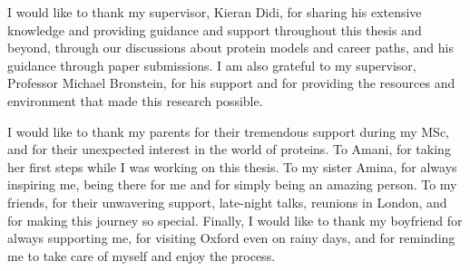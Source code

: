 I would like to thank my supervisor, Kieran Didi, for sharing his extensive knowledge and providing guidance and support throughout this thesis and beyond, through our discussions about protein models and career paths, and his guidance through paper submissions. I am also grateful to my supervisor, Professor Michael Bronstein, for his support and for providing the resources and environment that made this research possible.


I would like to thank my parents for their tremendous support during my MSc, and for their unexpected interest in the world of proteins. To Amani, for taking her first steps while I was working on this thesis. To my sister Amina, for always inspiring me, being there for me and for simply being an amazing person. To my friends, for their unwavering support, late-night talks, reunions in London, and for making this journey so special. Finally, I would like to thank my boyfriend for always supporting me, for visiting Oxford even on rainy days, and for reminding me to take care of myself and enjoy the process.
